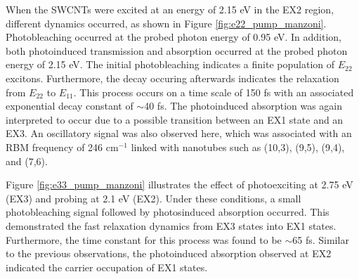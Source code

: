When the SWCNTs were excited at an energy of 2.15 eV in the EX2 region, different dynamics occurred, as shown in Figure \ref{fig:e22_pump_manzoni}. Photobleaching occurred at the probed photon energy of 0.95 eV. In addition, both photoinduced transmission and absorption occurred at the probed photon energy of 2.15 eV. The initial photobleaching indicates a finite population of $E_{22}$ excitons. Furthermore, the decay occuring afterwards indicates the relaxation from $E_{22}$ to $E_{11}$. This process occurs on a time scale of 150 fs with an associated exponential decay constant of $\sim$40 fs. The photoinduced absorption was again interpreted to occur due to a possible transition between an EX1 state and an EX3. An oscillatory signal was also observed here, which was associated with an RBM frequency of 246 $\text{cm}^{-1}$ linked with nanotubes such as (10,3), (9,5), (9,4), and (7,6).

Figure \ref{fig:e33_pump_manzoni} illustrates the effect of photoexciting at 2.75 eV (EX3) and probing at 2.1 eV (EX2). Under these conditions, a small photobleaching signal followed by photosinduced absorption occurred. This demonstrated the fast relaxation dynamics from EX3 states into EX1 states. Furthermore, the time constant for this process was found to be $\sim$65 fs. Similar to the previous observations, the photoinduced absorption observed at EX2 indicated the carrier occupation of EX1 states.

